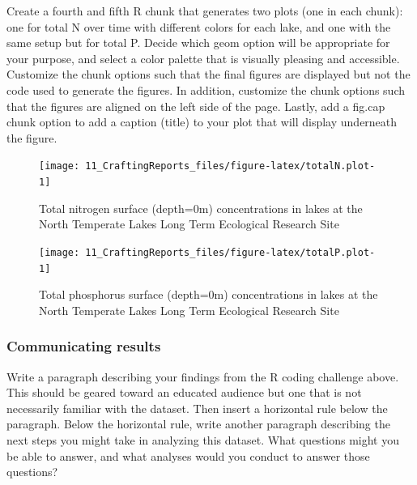 \documentclass[
]{article}
\begin{document}
Create a fourth and fifth R chunk that generates two plots (one in each
chunk): one for total N over time with different colors for each lake,
and one with the same setup but for total P. Decide which geom option
will be appropriate for your purpose, and select a color palette that is
visually pleasing and accessible. Customize the chunk options such that
the final figures are displayed but not the code used to generate the
figures. In addition, customize the chunk options such that the figures
are aligned on the left side of the page. Lastly, add a fig.cap chunk
option to add a caption (title) to your plot that will display
underneath the figure.

\begin{figure}[H]

\texttt{[image: 11\_CraftingReports\_files/figure-latex/totalN.plot-1]} \hfill{}

\caption{Total nitrogen surface (depth=0m) concentrations in lakes at the North Temperate Lakes Long Term Ecological Research Site}\label{fig:totalN.plot}
\end{figure}

\begin{figure}[H]

\texttt{[image: 11\_CraftingReports\_files/figure-latex/totalP.plot-1]} \hfill{}

\caption{Total phosphorus surface (depth=0m) concentrations in lakes at the North Temperate Lakes Long Term Ecological Research Site}\label{fig:totalP.plot}
\end{figure}

\hypertarget{communicating-results}{%
\subsubsection{Communicating results}\label{communicating-results}}

Write a paragraph describing your findings from the R coding challenge
above. This should be geared toward an educated audience but one that is
not necessarily familiar with the dataset. Then insert a horizontal rule
below the paragraph. Below the horizontal rule, write another paragraph
describing the next steps you might take in analyzing this dataset. What
questions might you be able to answer, and what analyses would you
conduct to answer those questions?
\end{document}
